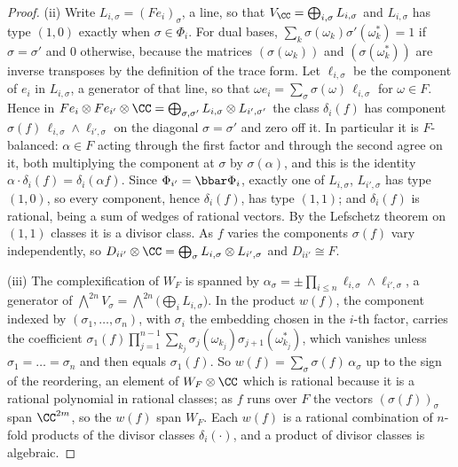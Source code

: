 \begin{proof}
(ii) Write $L_{i,\sigma}=(Fe_{i})_{\sigma}$, a line, so that
$V_{\CC}=\bigoplus_{i,\sigma}L_{i,\sigma}$ and $L_{i,\sigma}$ has type $(1,0)$
exactly when $\sigma\in\Phi_{i}$. For dual bases,
$\sum_{k}\sigma(\omega_{k})\sigma'(\omega_{k}^{*})=1$ if $\sigma=\sigma'$ and
$0$ otherwise, because the matrices $(\sigma(\omega_{k}))$ and
$(\sigma(\omega_{k}^{*}))$ are inverse transposes by the definition of the
trace form. Let $\ell_{i,\sigma}$ be the component of $e_{i}$ in
$L_{i,\sigma}$, a generator of that line, so that
$\omega e_{i}=\sum_{\sigma}\sigma(\omega)\,\ell_{i,\sigma}$ for $\omega\in F$.
Hence in $Fe_{i}\otimes Fe_{i'}\otimes\CC
=\bigoplus_{\sigma,\sigma'}L_{i,\sigma}\otimes L_{i',\sigma'}$ the class
$\delta_{i}(f)$ has component $\sigma(f)\,\ell_{i,\sigma}\wedge\ell_{i',\sigma}$
on the diagonal $\sigma=\sigma'$ and zero off it. In particular it is
$F$-balanced: $\alpha\in F$ acting through the first factor and through the
second agree on it, both multiplying the component at $\sigma$ by
$\sigma(\alpha)$, and this is the identity
$\alpha\cdot\delta_{i}(f)=\delta_{i}(\alpha f)$. Since $\Phi_{i'}=\bbar\Phi_{i}$,
exactly one of $L_{i,\sigma}$, $L_{i',\sigma}$ has type $(1,0)$, so every
component, hence $\delta_{i}(f)$, has type $(1,1)$; and $\delta_{i}(f)$ is
rational, being a sum of wedges of rational vectors. By the Lefschetz theorem
on $(1,1)$ classes it is a divisor class. As $f$ varies the components
$\sigma(f)$ vary independently, so $D_{ii'}\otimes\CC=\bigoplus_{\sigma}
L_{i,\sigma}\otimes L_{i',\sigma}$ and $D_{ii'}\cong F$.

(iii) The complexification of $W_{F}$ is spanned by
$\alpha_{\sigma}=\pm\prod_{i\le n}\ell_{i,\sigma}\wedge\ell_{i',\sigma}$, a
generator of $\bigwedge^{2n}V_{\sigma}=\bigwedge^{2n}\bigl(\bigoplus_{i}L_{i,\sigma}\bigr)$.
In the product $w(f)$, the component indexed by $(\sigma_{1},\dots,\sigma_{n})$,
with $\sigma_{i}$ the embedding chosen in the $i$-th factor, carries the
coefficient
$\sigma_{1}(f)\prod_{j=1}^{n-1}\sum_{k_{j}}\sigma_{j}(\omega_{k_{j}})\sigma_{j+1}(\omega_{k_{j}}^{*})$,
which vanishes unless $\sigma_{1}=\dots=\sigma_{n}$ and then equals
$\sigma_{1}(f)$. So $w(f)=\sum_{\sigma}\sigma(f)\,\alpha_{\sigma}$ up to the
sign of the reordering, an element of $W_{F}\otimes\CC$ which is rational
because it is a rational polynomial in rational classes; as $f$ runs over
$F$ the vectors $(\sigma(f))_{\sigma}$ span $\CC^{2m}$, so the $w(f)$ span
$W_{F}$. Each $w(f)$ is a rational combination of $n$-fold products of the
divisor classes $\delta_{i}(\cdot)$, and a product of divisor classes is
algebraic.
\end{proof}

